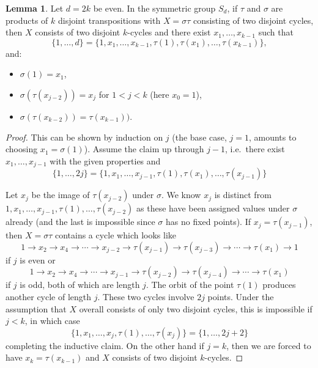 \documentclass[11pt]{article}           %
\theoremstyle{definition}
\newtheorem{lem}{Lemma}[section]
\begin{document}
\begin{lem}
  Let $d=2k$ be even. In the symmetric group $S_d$, if $\tau$ and $\sigma$ are products of $k$ disjoint
  transpositions with $X=\sigma\tau$ consisting of two disjoint cycles, then $X$
  consists of two disjoint $k$-cycles and there exist
  $x_1,\dots,x_{k-1}$ such that
  \[
  \{1,\dots,d\}=\{1,x_1,\dots,x_{k-1},\tau(1),\tau(x_1),\dots,\tau(x_{k-1})\},
  \]
  and:
  \begin{itemize}
  \item $\sigma(1)=x_1$, 
  \item $\sigma(\tau(x_{j-2}))=x_j$ for $1<j<k$ (here $x_0=1$),
  \item $\sigma(\tau(x_{k-2}))= \tau(x_{k-1}))$.
  \end{itemize}
\end{lem}
\begin{proof}
  This can be shown by induction on $j$ (the base case, $j=1$, amounts to choosing $x_1=\sigma(1)$).
  Assume the claim up through $j-1$, i.e.\ there exist
  $x_1,\dots,x_{j-1}$ with the given properties and
  \[\{1,\dots,2j\}=\{1,x_1,\dots,x_{j-1},\tau(1),\tau(x_1),\dots,\tau(x_{j-1})\}\]

  Let $x_j$ be
  the image of $\tau(x_{j-2})$ under $\sigma$.
  We know $x_j$ is distinct from $1,x_1,\dots,x_{j-1},\tau(1),\dots,\tau(x_{j-2})$
  as these have been assigned values under $\sigma$ already (and the last is impossible
  since $\sigma$ has no fixed points).
  If $x_j=\tau(x_{j-1})$, then $X=\sigma\tau$ contains a cycle
  which looks like
  \[
  1\to x_2\to x_4\to\cdots\to x_{j-2}\to \tau(x_{j-1})\to \tau(x_{j-3})\to\cdots\to \tau(x_1)\to 1
  \]
  if $j$ is even or
  \[
  1\to x_2\to x_4\to\cdots\to x_{j-1}\to \tau(x_{j-2})\to \tau(x_{j-4})\to\cdots\to \tau(x_1)
  \]
  if $j$ is odd, both of which are length $j$. The orbit of the point $\tau(1)$ produces
  another cycle of length $j$. These two cycles involve $2j$ points.
  Under the assumption that $X$ overall consists of only
  two disjoint cycles, this is impossible if $j<k$, in which case
  \[
  \{1,x_1,\dots,x_{j},\tau(1),\dots,\tau(x_{j})\}=\{1,\dots,2j+2\}
  \]
  completing the inductive claim. On the other hand if $j=k$, then
  we are forced to have $x_k=\tau(x_{k-1})$
  and $X$ consists of two disjoint $k$-cycles.

  \end{proof}
\end{document}
